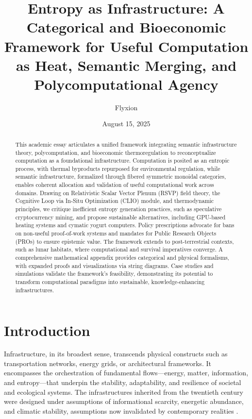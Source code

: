 \documentclass[12pt]{article}
\title{Entropy as Infrastructure: A Categorical and Bioeconomic Framework for Useful Computation as Heat, Semantic Merging, and Polycomputational Agency}
\author{Flyxion}
\date{August 15, 2025}
\begin{document}
\maketitle

\begin{abstract}
This academic essay articulates a unified framework integrating semantic infrastructure theory, polycomputation, and bioeconomic thermoregulation to reconceptualize computation as a foundational infrastructure. Computation is posited as an entropic process, with thermal byproducts repurposed for environmental regulation, while semantic infrastructure, formalized through fibered symmetric monoidal categories, enables coherent allocation and validation of useful computational work across domains. Drawing on Relativistic Scalar Vector Plenum (RSVP) field theory, the Cognitive Loop via In-Situ Optimization (CLIO) module, and thermodynamic principles, we critique inefficient entropy generation practices, such as speculative cryptocurrency mining, and propose sustainable alternatives, including GPU-based heating systems and cymatic yogurt computers. Policy prescriptions advocate for bans on non-useful proof-of-work systems and mandates for Public Research Objects (PROs) to ensure epistemic value. The framework extends to post-terrestrial contexts, such as lunar habitats, where computational and survival imperatives converge. A comprehensive mathematical appendix provides categorical and physical formalisms, with expanded proofs and visualizations via string diagrams. Case studies and simulations validate the framework's feasibility, demonstrating its potential to transform computational paradigms into sustainable, knowledge-enhancing infrastructures.
\end{abstract}

\section{Introduction}
\label{sec:introduction}

Infrastructure, in its broadest sense, transcends physical constructs such as transportation networks, energy grids, or architectural frameworks. It encompasses the orchestration of fundamental flows—energy, matter, information, and entropy—that underpin the stability, adaptability, and resilience of societal and ecological systems. The infrastructures inherited from the twentieth century were designed under assumptions of informational scarcity, energetic abundance, and climatic stability, assumptions now invalidated by contemporary realities \citep{DalyFarley2011}.
\end{document}
